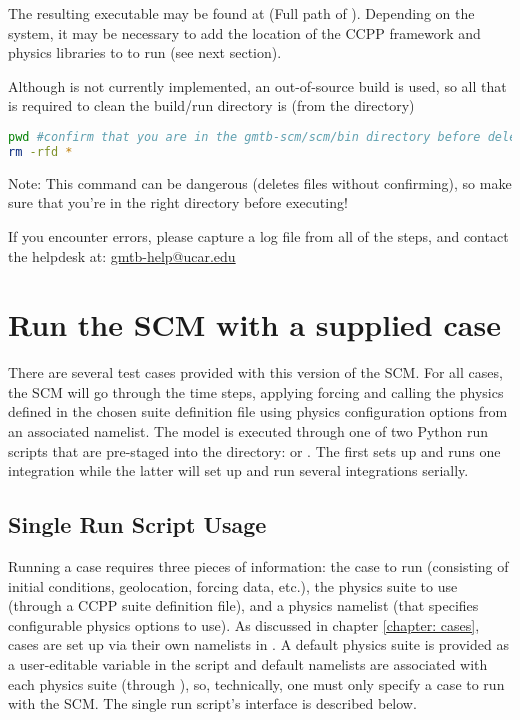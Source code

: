 The resulting executable may be found at  (Full path of ). Depending on the system, it may be necessary to add the location of the CCPP framework and physics libraries to  to run  (see next section).

Although  is not currently implemented, an out-of-source build is used, so all that is required to clean the build/run directory is (from the  directory)
\begin{lstlisting}[language=bash]
pwd #confirm that you are in the gmtb-scm/scm/bin directory before deleting files
rm -rfd *
\end{lstlisting}
Note: This command can be dangerous (deletes files without confirming), so make sure that you're in the right directory before executing!

If you encounter errors, please capture a log file from all of the steps, and contact the helpdesk at: \url{gmtb-help@ucar.edu}

\section{Run the SCM with a supplied case}
There are several test cases provided with this version of the SCM. For all cases, the SCM will go through the time steps, applying forcing and calling the physics defined in the chosen suite definition file using physics configuration options from an associated namelist. The model is executed through one of two Python run scripts that are pre-staged into the  directory:  or . The first sets up and runs one integration while the latter will set up and run several integrations serially. 

\subsection{Single Run Script Usage} \label{subsection: singlerunscript}
Running a case requires three pieces of information: the case to run (consisting of initial conditions, geolocation, forcing data, etc.), the physics suite to use (through a CCPP suite definition file), and a physics namelist (that specifies configurable physics options to use). As discussed in chapter \ref{chapter: cases}, cases are set up via their own namelists in . A default physics suite is provided as a user-editable variable in the script and default namelists are associated with each physics suite (through ), so, technically, one must only specify a case to run with the SCM. The single run script's interface is described below.

